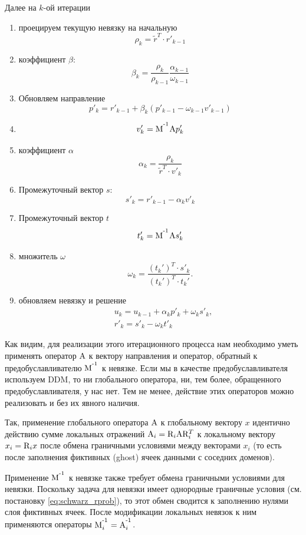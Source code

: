 Далее на $k$-ой итерации

\begin{enumerate}
\item проецируем текущую невязку на начальную
$$\rho_k = \tilde r^T \cdot r'_{k-1}$$
\item коэффициент $\beta$:
$$\beta_k = \frac{\rho_k}{\rho_{k-1}} \frac{\alpha_{k-1}}{\omega_{k-1}}$$
\item Обновляем направление
$$p'_k = r'_{k-1} + \beta_k \left( p'_{k-1} - \omega_{k-1} v'_{k-1} \right)$$
\item
$$v_k'={\rm M}^{\textsuperscript {-1}}{\rm A} p_k'$$
\item коэффициент $\alpha$
$$\alpha_k = \frac{\rho_k}{\tilde r^T \cdot v'_k}$$
\item Промежуточный вектор $s$:
$$s'_k =  r'_{k-1} - \alpha_k v'_k$$
\item Промежуточный вектор $t$
$$t'_k = {\rm M}^{\textsuperscript {-1}}{\rm A}s_k'$$
\item множитель $\omega$
$$\omega_k = \frac{ (t_k')^T \cdot s'_k} { (t_k')^T \cdot t_k' }.$$
\item обновляем невязку и решение
\begin{equation}
\label{eq:schwarz_bicgstab}
\begin{aligned}
& u_k = u_{k-1} + \alpha_k p'_k + \omega_k s'_k, \\
& r'_k = s'_k - \omega_k t'_k
\end{aligned}
\end{equation}
\end{enumerate}

Как видим, для реализации этого итерационного процесса нам необходимо уметь
применять оператор ${\rm A}$ к вектору направления и оператор, обратный к предобуславливателю ${\rm M}^{\textsuperscript {-1}}$ к невязке.
Если мы в качестве предобуславливателя используем DDM, то ни глобального оператора, ни, тем более, обращенного предобуславливателя, у нас нет.
Тем не менее, действие этих операторов можно реализовать и без их явного наличия.

Так, применение глобального оператора ${\rm A}$ к глобальному вектору $x$ идентично
действию сумме локальных отражений ${\rm A}_i = {\rm R}_i {\rm A} {\rm R}_i^T$ к локальному вектору $x_i = {\rm R}_i x$
после обмена граничными условиями между векторами $x_i$ (то есть после заполнения фиктивных (ghost) ячеек данными с соседних доменов).

Применение ${\rm M}^{\textsuperscript {-1}}$ к невязке также требует обмена граничными условиями для невязки. Поскольку задача
для невязки имеет однородные граничные условия (см. постановку \cref{eq:schwarz_rprob}), то этот обмен сводится к заполнению нулями слоя фиктивных ячеек.
После модификации локальных невязок к ним применяются операторы ${\rm M}^{\textsuperscript {-1}}_i = {\rm A}^{\textsuperscript {-1}}_i$.



